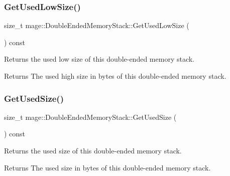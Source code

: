 \subsubsection{\texorpdfstring{Get\+Used\+Low\+Size()}{GetUsedLowSize()}}
{\footnotesize\ttfamily size\+\_\+t mage\+::\+Double\+Ended\+Memory\+Stack\+::\+Get\+Used\+Low\+Size (\begin{DoxyParamCaption}{ }\end{DoxyParamCaption}) const\hspace{0.3cm}{\ttfamily [noexcept]}}

Returns the used low size of this double-\/ended memory stack.

\begin{DoxyReturn}{Returns}
The used high size in bytes of this double-\/ended memory stack. 
\end{DoxyReturn}
\mbox{\label{classmage_1_1_double_ended_memory_stack_ae9c3c9a0f4e330b20ef63e0a21b91459}} 
\subsubsection{\texorpdfstring{Get\+Used\+Size()}{GetUsedSize()}}
{\footnotesize\ttfamily size\+\_\+t mage\+::\+Double\+Ended\+Memory\+Stack\+::\+Get\+Used\+Size (\begin{DoxyParamCaption}{ }\end{DoxyParamCaption}) const\hspace{0.3cm}{\ttfamily [noexcept]}}

Returns the used size of this double-\/ended memory stack.

\begin{DoxyReturn}{Returns}
The used size in bytes of this double-\/ended memory stack. 
\end{DoxyReturn}
\mbox{\label{classmage_1_1_double_ended_memory_stack_aafcc4b3cd8d87d75cc3de53994b6ef7e}} 
